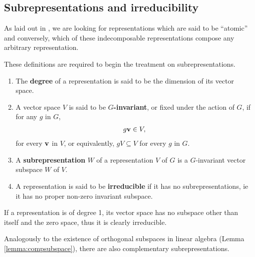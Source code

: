 	\subsection{Subrepresentations and irreducibility}
	
		As laid out in \cite{FultonHarris}, we are looking for representations which are said to be ``atomic'' and conversely, which of these indecomposable representations compose any arbitrary representation. %
		
		\begin{definition}\label{def:subreprs}
			These definitions are required to begin the treatment on subrepresentations.		
			\begin{enumerate}
				
				\item The \textbf{degree} of a representation is said to be the dimension of its vector space.
				
				\item A vector space $V$ is said to be \textbf{$G$-invariant}, or fixed under the action of $G$, if for any $g$ in $G$, 
				\begin{align}
					g\mathbf{v} \in V,
				\end{align}
				for every $\mathbf{v}$ in $V$, or equivalently, $gV \subseteq V$	for every $g$ in $G$.
				
				\item A \textbf{subrepresentation} $W$ of a representation $V$ of $G$ is a $G$-invariant vector subspace $W$ of $V$.
				
				\item A representation is said to be \textbf{irreducible} if it has no subrepresentations, ie it has no proper non-zero invariant subspace.
			\end{enumerate}
		\end{definition}

		\begin{corollary}
			If a representation is of degree 1, its vector space has no subspace other than itself and the zero space, thus it is clearly irreducible.
		\end{corollary}	
		
		Analogously to the existence of orthogonal subspaces in linear algebra (Lemma \ref{lemma:compsubspace}), there are also complementary subrepresentations.
		
